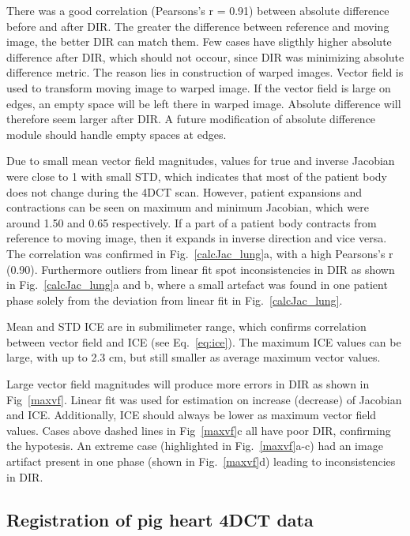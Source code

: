 \documentclass[type=dr, dr=rernat, accentcolor=tud7b,colorbacktitle, bigchapter, openright, twoside, 12pt ]{tudthesis}
\begin{document}
There was a good correlation (Pearsons's r = 0.91) between absolute difference before and after DIR. The greater the difference between reference and moving image, the better DIR can match them. Few cases
have sligthly higher absolute difference after DIR, which should not occour, since DIR was minimizing absolute difference metric. The reason lies in construction of warped images. Vector field is used to transform
moving image to warped image. If the vector field is large on edges, an empty space will be left there in warped image. Absolute difference will therefore seem larger after DIR. A future modification of absolute difference
module should handle empty spaces at edges.

Due to small mean vector field magnitudes, values for true and inverse Jacobian were close to 1 with small STD, which indicates that most of the patient body does not change during the 4DCT scan.
However, patient expansions and contractions can be seen on maximum and minimum Jacobian, which were around 1.50 and 0.65 respectively. If a part of a patient body contracts from reference to moving image, 
then it expands in inverse direction and vice versa. The correlation was confirmed in Fig.~\ref{calcJac_lung}a, with a high Pearsons's r (0.90). Furthermore outliers from linear fit spot inconsistencies
in DIR as shown in Fig.~\ref{calcJac_lung}a and b, where a small artefact was found in one patient phase solely from the deviation from linear fit in Fig.~\ref{calcJac_lung}.

Mean and STD ICE are in submilimeter range, which confirms correlation between vector field and ICE (see Eq.~\ref{eq:ice}). The maximum ICE values can be large, with up to 2.3 cm, 
but still smaller as average maximum vector values. 

Large vector field magnitudes will produce more errors in DIR as shown in Fig~\ref{maxvf}. Linear fit was used for estimation on increase (decrease) of Jacobian and ICE. Additionally, ICE
should always be lower as maximum vector field values. Cases above dashed lines in Fig~\ref{maxvf}c all have poor DIR, confirming the hypotesis. An extreme case (highlighted in Fig.~\ref{maxvf}a-c)
had an image artifact present in one phase (shown in Fig.~\ref{maxvf}d) leading to inconsistencies in DIR.


\subsection{Registration of pig heart 4DCT data}
\end{document}
